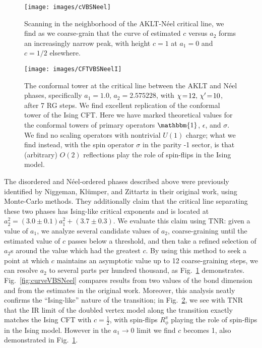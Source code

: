 \documentclass[aps,prb,letterpaper,superscriptaddress,twocolumn,showpacs,floatfix,10pt]{revtex4-1}
\begin{document}
\begin{figure}[h!]
\texttt{[image: images/cVBSNeel]}
\caption{Scanning in the neighborhood of the AKLT-N\'eel critical line,
we find as we coarse-grain that the curve of estimated $c$ versus $a_2$
forms an increasingly narrow
peak, with height $c=1$ at $a_1=0$ and $c=1/2$ elsewhere.}
\label{fig:cVBSNeel}
\end{figure}

\begin{figure}[h!]
\texttt{[image: images/CFTVBSNeelI]}
\caption{The conformal tower at the critical line between the AKLT and
N\'eel phases, specifically $a_1 = 1.0$, $a_2 = 2.575228$, with
$\chi\nobreak\!=\nobreak\!12, \,\chi'\nobreak\!=\nobreak\!10$, after 7 RG steps.
We find excellent replication of the conformal
tower of the Ising CFT. Here we have marked theoretical values for the
conformal towers of primary operators
$\mathbbm{1}$, $\epsilon$, and $\sigma$. We find no scaling
operators with nontrivial $U(1)$ charge; what we find instead, with the
spin operator $\sigma$ in the parity -1 sector, is that (arbitrary) $O(2)$
reflections play the role of spin-flips in the Ising model.}
\label{fig:CFTVBSNeelIsing}
\end{figure}

The disordered and N\'eel-ordered phases described above were previously
identified by Niggeman, Kl\"umper, and Zittartz in their original
work, using Monte-Carlo methods. They additionally claim that the critical line
separating these two phases has Ising-like critical exponents and is located at
$a_2^2 = (3.0\pm0.1)a_1^2 + (3.7\pm0.3)$. We evaluate this claim using TNR:
given a value of $a_1$, we analyze several candidate values of $a_2$,
coarse-graining until the estimated value of $c$ passes below a threshold,
and then take a refined selection of $a_2$s around the value which
had the greatest $c$. By using this method to seek a point at which $c$
maintains an asymptotic value up to 12 coarse-graining steps,
we can resolve $a_2$ to several parts per hundred thousand,
as Fig.~\ref{fig:cVBSNeel} demonstrates. Fig.~\ref{fig:curveVBSNeel}
compares results from two values of the bond dimension and from the
estimates in the original work. Moreover, this analysis neatly
confirms the ``Ising-like'' nature of the transition; in 
Fig.~\ref{fig:CFTVBSNeelIsing}, we see with TNR that the IR limit of the
doubled vertex model along
the transition exactly matches the Ising CFT with $c=\frac{1}{2}$, with
spin-flips $R^\pi_\phi$ playing the role of spin-flips in the Ising model.
However in the $a_1\to 0$ limit we find $c$ becomes 1, also demonstrated in
Fig.~\ref{fig:cVBSNeel}.
\end{document}
